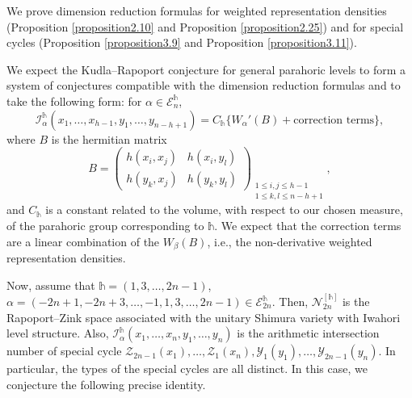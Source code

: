 \documentclass[11pt,oneside]{amsart}
\theoremstyle{plain}
\theoremstyle{definition}
\theoremstyle{remark}
\newcommand{\tx}[1]{\text{#1}}
\newcommand{\CE}{{\mathcal E}}
\newcommand{\CI}{{\mathcal I}}
\newcommand{\CN}{{\mathcal N}}
\newcommand{\CY}{{\mathcal Y}}
\newcommand{\CZ}{{\mathcal Z}}
\numberwithin{equation}{section}
\begin{document}
	 We prove dimension reduction formulas for weighted representation densities (Proposition \ref{proposition2.10} and Proposition \ref{proposition2.25}) and for special cycles (Proposition \ref{proposition3.9} and Proposition \ref{proposition3.11}).
     
     We expect the Kudla--Rapoport conjecture for general parahoric levels to form a system of conjectures compatible with the dimension reduction formulas and to take the following form: for $\alpha \in \CE_{n}^{\mathds{h}}$,
	 \begin{equation}\label{eq:conj}
	 	\CI_{\alpha}^{\mathds{h}}(x_1,\dots,x_{h-1},y_1,\dots,y_{n-h+1})=C_{\mathds{h}}\lbrace W_{\alpha}'(B)+\tx{correction terms}\rbrace,
	 \end{equation}
	 where $B$ is the hermitian matrix
	 \begin{equation*}
	 	B=	\left(\begin{array}{cc} 
	 		h(x_i,x_j) & h(x_i,y_l)\\
	 		h(y_k,x_j)& h(y_k,y_l)
	 	\end{array} 
	 	\right)_{\substack{1\leq i,j \leq h-1\\ 1 \leq k,l \leq n-h+1}},
	 \end{equation*}
	 and $C_{\mathds{h}}$ is a constant related to the volume, with respect to our chosen measure, of the parahoric group corresponding to $\mathds{h}$. We expect that the correction terms are a linear combination of the $W_{\beta}(B)$, i.e., the non-derivative weighted representation densities.
	 
	Now, assume that $\mathds{h}=(1,3,\dots,2n-1)$, $\alpha=(-2n+1,-2n+3,\dots,-1,1,3,\dots,2n-1) \in \CE_{2n}^{\mathds{h}}$. Then, $\CN_{2n}^{[\mathds{h}]}$ is the Rapoport--Zink space associated with the unitary Shimura variety with Iwahori level structure. Also, $\CI_{\alpha}^{\mathds{h}}(x_1,\dots,x_{n},y_1,\dots,y_{n})$ is the arithmetic intersection number of special cycle $\CZ_{2n-1}(x_1),\dots,\CZ_{1}(x_{n}),\CY_{1}(y_1),\dots,\CY_{2n-1}(y_{n})$.
	 In particular, the types of the special cycles are all distinct. In this case, we conjecture the following precise identity.
	 
\end{document}
